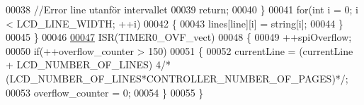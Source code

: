 \begin{DoxyCode}
00038 \textcolor{stringliteral}{        //Error line utanför intervallet}
00039 \textcolor{stringliteral}{        return;}
00040 \textcolor{stringliteral}{    \}}
00041 \textcolor{stringliteral}{    for(int i = 0; i < LCD\_LINE\_WIDTH; ++i)}
00042 \textcolor{stringliteral}{    \{}
00043 \textcolor{stringliteral}{        lines[line][i] = string[i];}
00044 \textcolor{stringliteral}{    \}}
00045 \textcolor{stringliteral}{\}}
00046 \textcolor{stringliteral}{}
\hypertarget{_l_c_d__controller_8c_source.tex_l00047}{}\hyperlink{_l_c_d__controller_8c_add2d7cdddfb682dcc0391e60cf42c7d6}{00047} \textcolor{stringliteral}{ISR(TIMER0\_OVF\_vect)}
00048 \textcolor{stringliteral}{\{}
00049 \textcolor{stringliteral}{    ++spiOverflow;  }
00050 \textcolor{stringliteral}{    if(++overflow\_counter > 150)}
00051 \textcolor{stringliteral}{    \{}
00052 \textcolor{stringliteral}{        currentLine = (currentLine + LCD\_NUMBER\_OF\_LINES) %
       4/*(LCD\_NUMBER\_OF\_LINES*CONTROLLER\_NUMBER\_OF\_PAGES)*/;}
00053 \textcolor{stringliteral}{        overflow\_counter = 0;}
00054 \textcolor{stringliteral}{    \}}
00055 \textcolor{stringliteral}{\}}
\end{DoxyCode}
